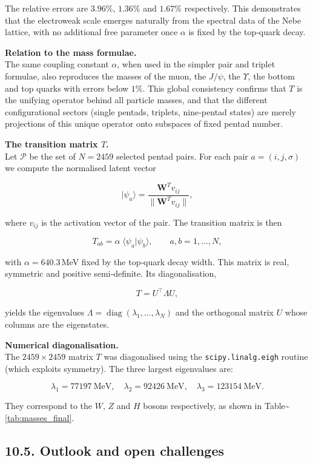 \documentclass[11pt]{article}
\let\oldmathcal\mathcal
\renewcommand{\mathcal}[1]{\oldmathcal{#1}}
\begin{document}
The relative errors are \(3.96\%\), \(1.36\%\) and \(1.67\%\)
respectively. This demonstrates that the electroweak scale emerges
naturally from the spectral data of the Nebe lattice, with no additional
free parameter once \(\alpha\) is fixed by the top‑quark decay.

\textbf{Relation to the mass formulae.}\\
The same coupling constant \(\alpha\), when used in the simpler pair and
triplet formulae, also reproduces the masses of the muon, the
\(J/\psi\), the \(\Upsilon\), the bottom and top quarks with errors
below \(1\%\). This global consistency confirms that \(T\) is the
unifying operator behind all particle masses, and that the different
configurational sectors (single pentads, triplets, nine‑pentad states)
are merely projections of this unique operator onto subspaces of fixed
pentad number.

\textbf{The transition matrix \(T\).}\\
Let \(\mathcal{P}\) be the set of \(N = 2459\) selected pentad pairs.
For each pair \(a = (i,j,\sigma)\) we compute the normalised latent
vector

\[
|\psi_a\rangle = \frac{\mathbf{W}^T v_{ij}}{\|\mathbf{W}^T v_{ij}\|},
\]

where \(v_{ij}\) is the activation vector of the pair. The transition
matrix is then

\[
T_{ab} = \alpha \; \langle\psi_a|\psi_b\rangle,
\qquad a,b = 1,\dots,N,
\]

with \(\alpha = 640.3\)\,MeV fixed by the top‑quark decay width. This
matrix is real, symmetric and positive semi‑definite. Its
diagonalisation,

\[
T = U^\top \Lambda U,
\]

yields the eigenvalues
\(\Lambda = \operatorname{diag}(\lambda_1,\dots,\lambda_N)\) and the
orthogonal matrix \(U\) whose columns are the eigenstates.

\textbf{Numerical diagonalisation.}\\
The \(2459\times 2459\) matrix \(T\) was diagonalised using the
\texttt{scipy.linalg.eigh} routine (which exploits symmetry). The three
largest eigenvalues are:

\[
\lambda_1 = 77197\ \text{MeV},\quad
\lambda_2 = 92426\ \text{MeV},\quad
\lambda_3 = 123154\ \text{MeV}.
\]

They correspond to the \(W\), \(Z\) and \(H\) bosons respectively, as
shown in Table\textasciitilde{}\ref{tab:masses_final}.

\hypertarget{outlook-and-open-challenges}{%
\subsection{10.5. Outlook and open
challenges}\label{outlook-and-open-challenges}}
\end{document}
